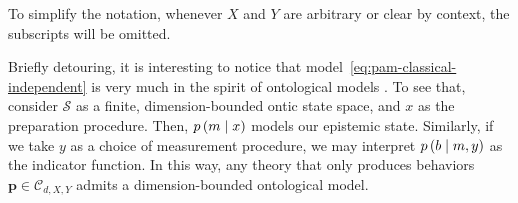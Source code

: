             To simplify the notation, whenever $X$ and $Y$ are arbitrary or clear by context, the subscripts will be omitted.
            
            Briefly detouring, it is interesting to notice that model~\eqref{eq:pam-classical-independent} is very much in the spirit of ontological models \cite{spekkens_2005_contextuality,harrigan_2008_ontological,galvao_2009_economical}. To see that, consider $\mathcal{S}$ as a finite, dimension-bounded ontic state space, and $x$ as the preparation procedure. Then, $p \left( m \mid x \right)$ models our epistemic state. Similarly, if we take $y$ as a choice of measurement procedure, we may interpret $p \left( b \mid m,y \right)$ as the indicator function. In this way, any theory that only produces behaviors $\mathbf{p} \in \mathcal{C}_{d,X,Y}$ admits a dimension-bounded ontological model.
            
